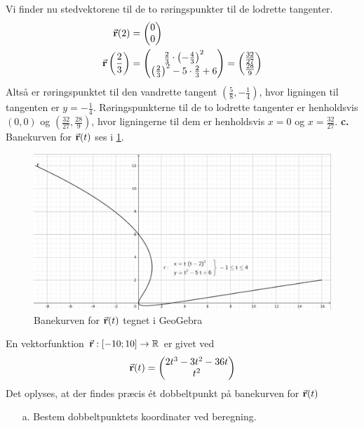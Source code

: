 \documentclass{article}
\begin{document}
Vi finder nu stedvektorene til de to røringspunkter til de lodrette tangenter.
\begin{equation*}
\begin{split}
  \va{r}(2)&=\mqty(0\\ 0) \\
  \va{r}\left(\frac{2}{3}\right)&= \mqty(\frac{2}{3} \cdot \left(-\frac{4}{3}\right)^2\\ \left(\frac{2}{3}\right)^2-5 \cdot \frac{2}{3}+6)=\mqty(\frac{32}{27}\\ \frac{28}{9}) 
\end{split}
\end{equation*}
Altså er røringspunktet til den vandrette tangent $\left(\frac{5}{8}, -\frac{1}{4}\right) $, hvor ligningen til tangenten er $y=-\frac{1}{4}$.
Røringspunkterne til de to lodrette tangenter er henholdsvis $(0,0)$ og $(\frac{32}{27},\frac{28}{9})$, hvor ligningerne til dem er henholdsvis $x=0$ og $x=\frac{32}{27}$. 
\textbf{c.} Banekurven for $\va{r}(t)$ ses i \cref{fig:vektorfunktion}. 
\begin{figure}[H]
\begin{center}
  \includegraphics[width=\textwidth]{vektorfunktion.png}
\end{center}
  \caption{Banekurven for $\va{r}(t)$ tegnet i GeoGebra}
\label{fig:vektorfunktion}
\end{figure}
\begin{question}{}{}
  En vektorfunktion $\va{r}:[-10;10]\to \mathbb{R}$ er givet ved 
  \[
  \va{r}(t)=\mqty(2t^3-3t^2-36t\\ t^2) 
  \] 
  Det oplyses, at der findes præcis ét dobbeltpunkt på banekurven for $\va{r}(t)$
  \begin{itemize}
    \item[a.] Bestem dobbeltpunktets koordinater ved beregning.
  \end{itemize}
\end{question}
\end{document}
